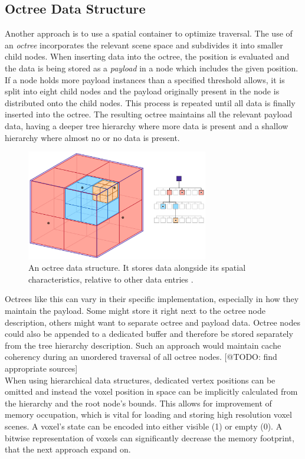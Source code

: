 \subsection*{Octree Data Structure} \label{subsec-octree-data-structure}

Another approach is to use a spatial container to optimize traversal. The use of an \emph{octree} 
incorporates the relevant scene space and subdivides it into smaller child nodes. When inserting data 
into the octree, the position is evaluated and the data is being stored as a \emph{payload} in 
a node which includes the given position. If a node holds more payload instances than a specified threshold 
allows, it is split into eight child nodes and the payload originally present in the node is 
distributed onto the child nodes. This process is repeated until all data is finally inserted 
into the octree. The resulting octree maintains all the relevant payload data, having a deeper tree 
hierarchy where more data is present and a shallow hierarchy where almost no or no data is present.

\begin{figure}[h]
    \centering
    \includegraphics[width=300px]{images/graphics/octree.jpg}
    \caption{An octree data structure. It stores data alongside its spatial characteristics, relative to 
    other data entries \cite{Six2021}.}
    \label{fig:octree}
\end{figure}

\noindent
Octrees like this can vary in their specific implementation, especially in how they maintain the 
payload. Some might store it right next to the octree node description, others might want to separate 
octree and payload data. Octree nodes could also be appended to a dedicated buffer and therefore be stored 
separately from the tree hierarchy description. Such an approach would maintain cache coherency during an 
unordered traversal of all octree nodes. [@TODO: find appropriate sources]\\

\noindent
When using hierarchical data structures, dedicated vertex positions can be omitted and instead 
the voxel position in space can be implicitly calculated from the hierarchy and the root node's bounds. 
This allows for improvement of memory occupation, which is vital for loading and storing high 
resolution voxel scenes. A voxel's state can be encoded into either visible (1) or empty (0).
A bitwise representation of voxels can significantly decrease the memory footprint, that the next 
approach expand on.


